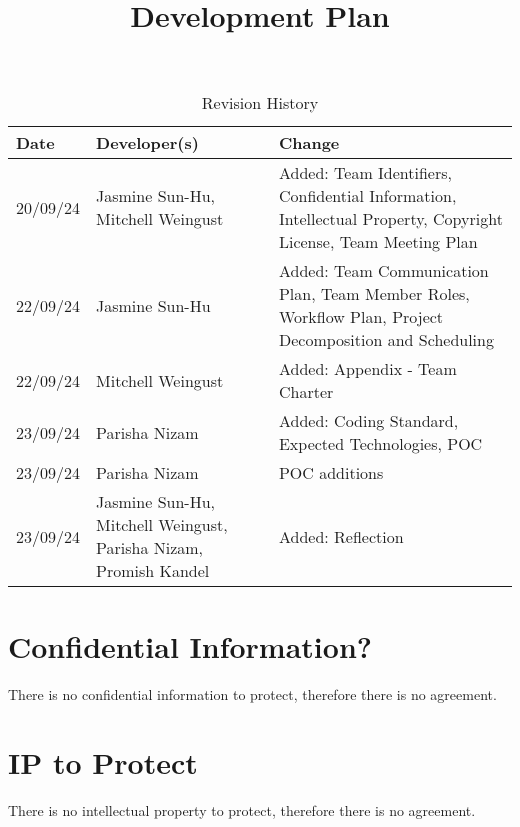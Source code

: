 \documentclass{article}
\title{Development Plan\\\progname}
\author{\authname}
\date{}
\begin{document}
\maketitle

\begin{table}[hp]
\caption{Revision History} \label{TblRevisionHistory}
\begin{tabularx}{\textwidth}{p{1.5cm}p{3cm}X}
\toprule
\textbf{Date} & \textbf{Developer(s)} & \textbf{Change}\\
\midrule
20/09/24 & Jasmine Sun-Hu, Mitchell Weingust & Added: Team Identifiers, Confidential Information, Intellectual Property,
Copyright License, Team Meeting Plan\\
22/09/24 & Jasmine Sun-Hu & Added: Team Communication Plan, Team Member Roles, Workflow Plan, Project Decomposition and Scheduling\\
22/09/24 & Mitchell Weingust & Added: Appendix - Team Charter\\
23/09/24 & Parisha Nizam & Added: Coding Standard, Expected Technologies, POC \\
23/09/24 & Parisha Nizam & POC additions \\
23/09/24 & Jasmine Sun-Hu, Mitchell Weingust, Parisha Nizam, Promish Kandel & Added: Reflection \\
\bottomrule
\end{tabularx}
\end{table}

\newpage{}



\section{Confidential Information?}

There is no confidential information to protect, therefore there is no agreement.

\section{IP to Protect}

There is no intellectual property to protect, therefore there is no agreement.
\end{document}
